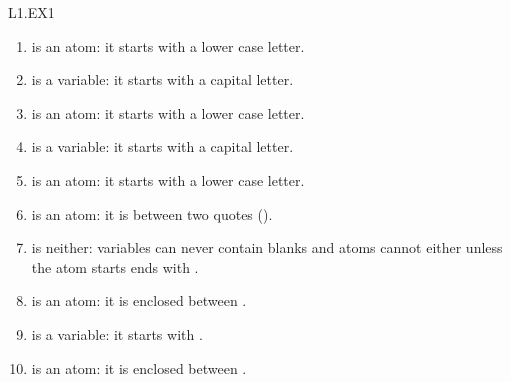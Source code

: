 
\begin{mozartANSWER}{L1.EX1}\begin{enumerate}
\item{} is an atom: it starts with a lower case letter.
\item{} is a variable: it starts with a capital letter.
\item{} is an atom: it starts with a lower case letter.
\item{} is a variable: it starts with a capital letter.
\item{} is an atom: it starts with a lower case letter.
\item{} is an atom: it is between two quotes ().
\item{} is neither: variables can never contain blanks and atoms cannot either unless the atom starts ends with .
\item{} is an atom: it is enclosed between .
\item{} is a variable: it starts with \mozartCODEINLINE{\mozartFACETEXT{\mozartUNDERSCORE{}}}.
\item{}is an atom: it is enclosed between .
\end{enumerate}
\end{mozartANSWER}
